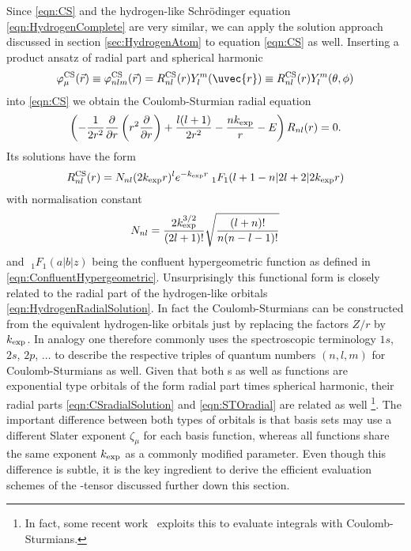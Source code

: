 Since \eqref{eqn:CS} and the hydrogen-like Schrödinger equation
\eqref{eqn:HydrogenComplete} are very similar,
we can apply the solution approach discussed in section \vref{sec:HydrogenAtom}
to equation \eqref{eqn:CS} as well.
Inserting a product ansatz of radial part and spherical harmonic
\begin{equation}
	\varphi^\text{CS}_\mu(\vec{r}) \equiv
	\varphi^\text{CS}_{nlm}(\vec{r}) = R^{\text{CS}}_{nl}(r) Y_l^m(\uvec{r})
	\equiv
	R^{\text{CS}}_{nl}(r) Y_l^m(\theta, \phi)
	\label{eqn:CSproduct}
\end{equation}
into \eqref{eqn:CS} we obtain the Coulomb-Sturmian radial equation
\begin{equation}
	\left( - \frac{1}{2r^2} \frac{\partial}{\partial r} \left( r^2 \frac{\partial}{\partial r} \right) + \frac{l (l+1)}{2 r^2}
	- \frac{nk_\text{exp}}{r} - E \right) R_{nl}(r) = 0.
	\label{eqn:CSRadial}
\end{equation}
Its solutions have the form
\begin{equation}
	R^\text{CS}_{nl}(r) = N_{nl} (2k_\text{exp} r)^l e^{-k_\text{exp} r}
	\;_1F_1\!\left(l+1-n \middle| 2l+2 \middle|2k_\text{exp} r\right)
	\label{eqn:CSradialSolution}
\end{equation}
with normalisation constant
\[ N_{nl} = \frac{2 k_\text{exp}^{3/2}}{(2l+1)!} \sqrt{ \frac{(l+n)!}{n (n-l-1)!}} \]
and $\;_1F_1\!\left(a|b|z\right)$ being the confluent hypergeometric function
as defined in \eqref{eqn:ConfluentHypergeometric}.
Unsurprisingly this functional form is closely related to the radial part of the
hydrogen-like orbitals \eqref{eqn:HydrogenRadialSolution}.
In fact the Coulomb-Sturmians can be constructed
from the equivalent hydrogen-like orbitals
just by replacing the factors $Z/r$ by $k_\text{exp}$.
In analogy one therefore commonly uses the spectroscopic terminology
$1s$, $2s$, $2p$, $\ldots$
to describe the respective triples
of quantum numbers $(n, l, m)$ for Coulomb-Sturmians as well.
Given that both {\STO}s as well as \CS functions are exponential type orbitals
of the form radial part times spherical harmonic,
their radial parts \eqref{eqn:CSradialSolution} and \eqref{eqn:STOradial}
are related as well%
\footnote{In fact, some recent work~\cite{Avery2017} exploits this to evaluate
\STO \ERI integrals with Coulomb-Sturmians.}.
The important difference between both types of orbitals is
that {\STO} basis sets may use a different Slater exponent $\zeta_\mu$ for each
\STO basis function,
whereas all \CS functions share the same exponent $k_\text{exp}$
as a commonly modified parameter.
Even though this difference is subtle,
it is the key ingredient to derive the efficient evaluation schemes
of the \CS-\ERI tensor discussed further down this section.

